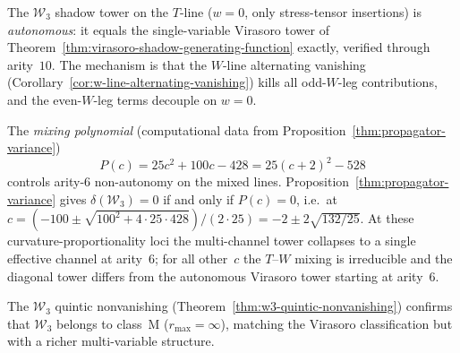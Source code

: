 \begin{remark}
\label{rem:w3-multi-channel-tower}
The $\mathcal{W}_3$ shadow tower on the $T$-line
($w = 0$, only stress-tensor insertions) is \emph{autonomous}:
it equals the single-variable Virasoro tower of
Theorem~\ref{thm:virasoro-shadow-generating-function} exactly,
verified through arity~$10$.  The mechanism is that the $W$-line
alternating vanishing
(Corollary~\ref{cor:w-line-alternating-vanishing}) kills all
odd-$W$-leg contributions, and the even-$W$-leg terms decouple on
$w = 0$.

The \emph{mixing polynomial} (computational data from Proposition~\ref{thm:propagator-variance})
\begin{equation}\label{eq:w3-mixing-polynomial}
P(c) = 25c^2 + 100c - 428 = 25(c+2)^2 - 528
\end{equation}
controls arity-$6$ non-autonomy on the mixed lines.
Proposition~\ref{thm:propagator-variance} gives
$\delta(\mathcal{W}_3) = 0$ if and only if $P(c) = 0$, i.e.\
at $c = (-100 \pm \sqrt{100^2 + 4\cdot 25\cdot 428})/(2\cdot 25)
= -2 \pm 2\sqrt{132/25}$.
At these curvature-proportionality loci the multi-channel tower
collapses to a single effective channel at arity~$6$; for all other~$c$ the
$T$--$W$ mixing is irreducible and the diagonal tower differs from
the autonomous Virasoro tower starting at arity~$6$.

The $\mathcal{W}_3$ quintic nonvanishing
(Theorem~\ref{thm:w3-quintic-nonvanishing}) confirms that
$\mathcal{W}_3$ belongs to class~M ($r_{\max} = \infty$), matching
the Virasoro classification but with a richer multi-variable structure.
\end{remark}


